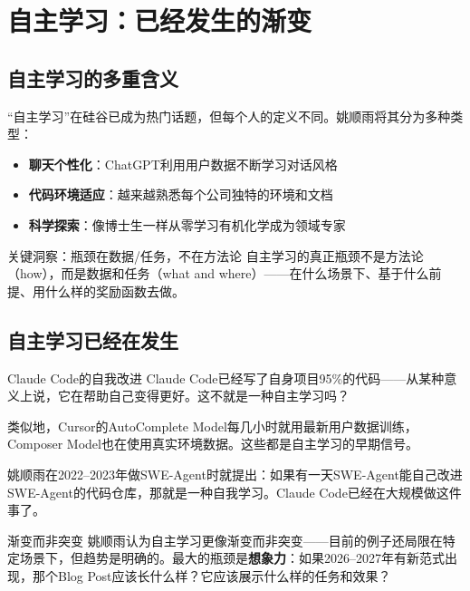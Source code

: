 \section{自主学习：已经发生的渐变}

\subsection{自主学习的多重含义}

``自主学习''在硅谷已成为热门话题，但每个人的定义不同。姚顺雨将其分为多种类型：

\begin{itemize}
\item \textbf{聊天个性化}：ChatGPT利用用户数据不断学习对话风格
\item \textbf{代码环境适应}：越来越熟悉每个公司独特的环境和文档
\item \textbf{科学探索}：像博士生一样从零学习有机化学成为领域专家
\end{itemize}

\begin{importantbox}{关键洞察：瓶颈在数据/任务，不在方法论}
自主学习的真正瓶颈不是方法论（how），而是数据和任务（what and where）——在什么场景下、基于什么前提、用什么样的奖励函数去做。
\end{importantbox}

\subsection{自主学习已经在发生}

\begin{knowledgebox}{Claude Code的自我改进}
Claude Code已经写了自身项目95\%的代码——从某种意义上说，它在帮助自己变得更好。这不就是一种自主学习吗？

类似地，Cursor的AutoComplete Model每几小时就用最新用户数据训练，Composer Model也在使用真实环境数据。这些都是自主学习的早期信号。
\end{knowledgebox}

姚顺雨在2022--2023年做SWE-Agent时就提出：如果有一天SWE-Agent能自己改进SWE-Agent的代码仓库，那就是一种自我学习。Claude Code已经在大规模做这件事了。

\begin{warningbox}{渐变而非突变}
姚顺雨认为自主学习更像渐变而非突变——目前的例子还局限在特定场景下，但趋势是明确的。最大的瓶颈是\textbf{想象力}：如果2026--2027年有新范式出现，那个Blog Post应该长什么样？它应该展示什么样的任务和效果？
\end{warningbox}


